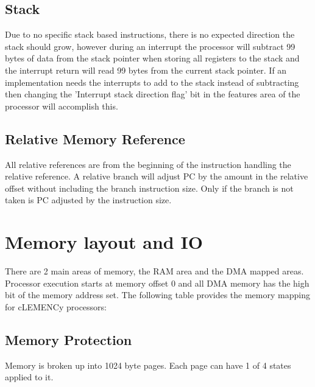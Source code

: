 \section{Stack}

Due to no specific stack based instructions, there is no expected direction the stack should grow, however during an interrupt the processor will subtract 99 bytes of data from the stack pointer when storing all registers to the stack and the interrupt return will read 99 bytes from the current stack pointer. If an implementation needs the interrupts to add to the stack instead of subtracting then changing the 'Interrupt stack direction flag' bit in the features area of the processor will accomplish this.




\section{Relative Memory Reference}

All relative references are from the beginning of the instruction handling the relative reference. A relative branch will adjust PC by the amount in the relative offset without including the branch instruction size. Only if the branch is not taken is PC adjusted by the instruction size.




\chapter{Memory layout and IO}

There are 2 main areas of memory, the RAM area and the DMA mapped areas. Processor execution starts at memory offset 0 and all DMA memory has the high bit of the memory address set. The following table provides the memory mapping for cLEMENCy processors:








\section{Memory Protection}

Memory is broken up into 1024 byte pages. Each page can have 1 of 4 states applied to it.





